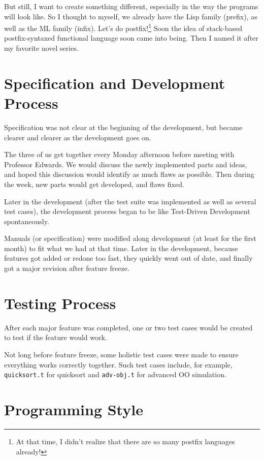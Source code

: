 \documentclass{report}
\begin{document}
But still, I want to create something different, especially in the way the programs will look like. So I thought to myself, we already have the Lisp family (prefix), as well as the ML family (infix). Let's do postfix!\footnote{At that time, I didn't realize that there are so many postfix languages already!} Soon the idea of stack-based postfix-syntaxed functional language soon came into being. Then I named it after my favorite novel series.

\section{Specification and Development Process}

Specification was not clear at the beginning of the development, but became clearer and clearer as the development goes on.

The three of us get together every Monday afternoon before meeting with Professor Edwards. We would discuss the newly implemented parts and ideas, and hoped this discussion would identify as much flaws as possible. Then during the week, new parts would get developed, and flaws fixed.

Later in the development (after the test suite was implemented as well as several test cases), the development process began to be like Test-Driven Development spontaneously.

Manuals (or specification) were modified along development (at least for the first month) to fit what we had at that time. Later in the development, because features got added or redone too fast, they quickly went out of date, and finally got a major revision after feature freeze.

\section{Testing Process}

After each major feature was completed, one or two test cases would be created to test if the feature would work.

Not long before feature freeze, some holistic test cases were made to ensure everything works correctly together. Such test cases include, for example, \texttt{quicksort.t} for quicksort and \texttt{adv-obj.t} for advanced OO simulation.

\section{Programming Style}
\end{document}

